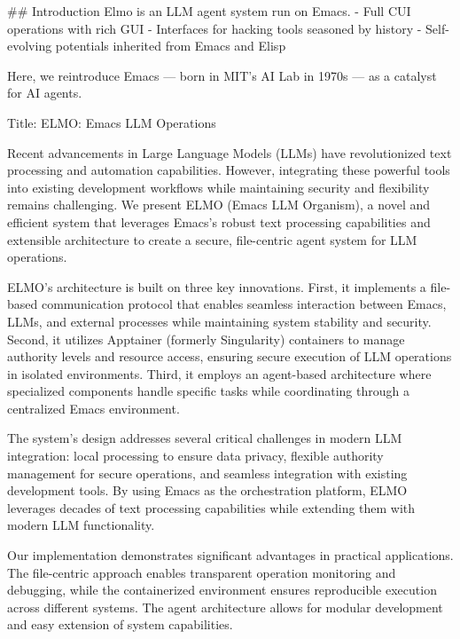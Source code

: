 
## Introduction
Elmo is an LLM agent system run on Emacs.
- Full CUI operations with rich GUI
- Interfaces for hacking tools seasoned by history
- Self-evolving potentials inherited from Emacs and Elisp

Here, we reintroduce Emacs — born in MIT's AI Lab in 1970s — as a catalyst for AI agents.


Title: ELMO: Emacs LLM Operations



Recent advancements in Large Language Models (LLMs) have revolutionized text processing and automation capabilities. However, integrating these powerful tools into existing development workflows while maintaining security and flexibility remains challenging. We present ELMO (Emacs LLM Organism), a novel and efficient system that leverages Emacs's robust text processing capabilities and extensible architecture to create a secure, file-centric agent system for LLM operations.

ELMO's architecture is built on three key innovations. First, it implements a file-based communication protocol that enables seamless interaction between Emacs, LLMs, and external processes while maintaining system stability and security. Second, it utilizes Apptainer (formerly Singularity) containers to manage authority levels and resource access, ensuring secure execution of LLM operations in isolated environments. Third, it employs an agent-based architecture where specialized components handle specific tasks while coordinating through a centralized Emacs environment.

The system's design addresses several critical challenges in modern LLM integration: local processing to ensure data privacy, flexible authority management for secure operations, and seamless integration with existing development tools. By using Emacs as the orchestration platform, ELMO leverages decades of text processing capabilities while extending them with modern LLM functionality.

Our implementation demonstrates significant advantages in practical applications. The file-centric approach enables transparent operation monitoring and debugging, while the containerized environment ensures reproducible execution across different systems. The agent architecture allows for modular development and easy extension of system capabilities.



